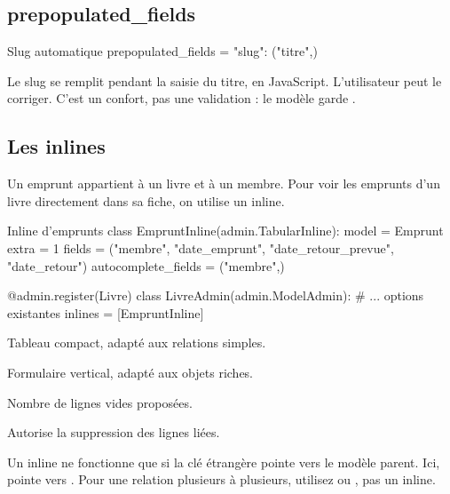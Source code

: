 \subsection{prepopulated\_fields}

\begin{codebox}[python]{Slug automatique}
prepopulated_fields = {"slug": ("titre",)}
\end{codebox}

Le slug se remplit pendant la saisie du titre, en JavaScript. L'utilisateur peut le
corriger. C'est un confort, pas une validation : le modèle garde
.

\subsection{Les inlines}

Un emprunt appartient à un livre et à un membre. Pour voir les emprunts d'un livre
directement dans sa fiche, on utilise un inline.

\begin{codebox}[python]{Inline d'emprunts}
class EmpruntInline(admin.TabularInline):
    model = Emprunt
    extra = 1
    fields = ("membre", "date_emprunt", "date_retour_prevue", "date_retour")
    autocomplete_fields = ("membre",)


@admin.register(Livre)
class LivreAdmin(admin.ModelAdmin):
    # ... options existantes
    inlines = [EmpruntInline]
\end{codebox}

\begin{description}[leftmargin=3.6cm,style=nextline]
  \item[\code{TabularInline}] Tableau compact, adapté aux relations simples.
  \item[\code{StackedInline}] Formulaire vertical, adapté aux objets riches.
  \item[\code{extra}] Nombre de lignes vides proposées.
  \item[\code{can\_delete}] Autorise la suppression des lignes liées.
\end{description}

\begin{attention}
Un inline ne fonctionne que si la clé étrangère pointe vers le modèle parent. Ici,
 pointe vers . Pour une relation
plusieurs à plusieurs, utilisez  ou
, pas un inline.
\end{attention}

